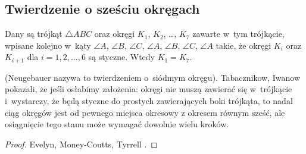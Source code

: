 %
\subsection{Twierdzenie o sześciu okręgach}

\begin{proposition}
%
    Dany są trójkąt $\triangle ABC$ oraz okręgi $K_1$, $K_2$, \ldots, $K_7$ zawarte w~tym trójkącie, wpisane kolejno w~kąty $\angle A$, $\angle B$, $\angle C$, $\angle A$, $\angle B$, $\angle C$, $\angle A$ takie, że okręgi $K_i$ oraz $K_{i+1}$ dla $i = 1, 2, \ldots, 6$ są styczne.
    Wtedy $K_1 = K_7$.
\end{proposition}

(Neugebauer \cite[s. 101]{neugebauer_2018} nazywa to twierdzeniem o~siódmym okręgu).
Tabacznikow, Iwanow \cite{ivanov_tabachnikov_2016} pokazali, że jeśli osłabimy założenia: okręgi nie muszą zawierać się w~trójkącie i~wystarczy, że będą styczne do prostych zawierających boki trójkąta, to nadal ciąg okręgów jest od pewnego miejsca okresowy z okresem równym sześć, ale osiągnięcie tego stanu może wymagać dowolnie wielu kroków.
%
%

\begin{proof}
    Evelyn, Money-Coutts, Tyrrell \cite[s. 49–58]{evelyn_money_coutts_tyrrell_1974}.
%
%
%
\end{proof}

%